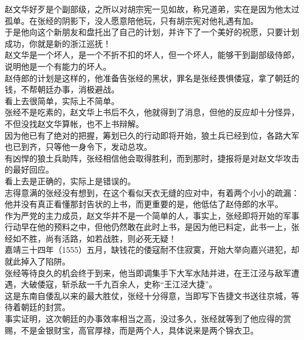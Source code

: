 \begin{multicols}{\theparacolNo}
赵文华好歹是个副部级，之所以对胡宗宪一见如故，称兄道弟，实在是因为他太过孤单。在张经的阴影下，没人愿意陪他玩，只有胡宗宪对他礼遇有加。\\

于是他向这个新朋友和盘托出了自己的计划，并许下了一个美好的祝愿，只要计划成功，你就是新的浙江巡抚！\\

赵文华是一个坏人，是一个不折不扣的坏人，但一个坏人，能够干到副部级侍郎，说明他是一个有能力的坏人。\\

赵侍郎的计划是这样的，他准备告张经的黑状，罪名是张经畏惧倭寇，拿了朝廷的钱，不帮朝廷办事，消极避战。\\

看上去很简单，实际上不简单。\\

张经不是吃素的，赵文华上书后不久，他就得到了消息，但他的反应却十分怪异，不但没找赵文华算帐，也不上书辩解。\\

因为他已有了绝对的把握，筹划已久的行动即将开始，狼土兵已经到位，各路大军也已到齐，只等他一身令下，发动总攻。\\

有凶悍的狼土兵助阵，张经相信他会取得胜利，而到那时，捷报将是对赵文华攻击的最好回应。\\

看上去是正确的，实际上是错误的。\\

志得意满的张经没有想到，在这个看似天衣无缝的应对中，有着两个小小的疏漏：他并没有真正看懂那封告状的上书，而更重要的是，他低估了赵侍郎的水平。\\

作为严党的主力成员，赵文华并不是一个简单的人，事实上，张经即将开始的军事行动早在他的预料之中，但他仍然敢在此时上书，是因为他已料定，此书一上，张经如不胜，尚有活路，如若战胜，则必死无疑！\\

嘉靖三十四年（1555）五月，缺钱花的倭寇耐不住寂寞，开始大举向嘉兴进犯，却就此掉入了陷阱。\\

张经等待良久的机会终于到来，他当即调集手下大军水陆并进，在王江泾与敌军遭遇，大破倭寇，斩杀敌一千九百余人，史称“王江泾大捷”。\\

这是东南自倭乱以来的最大胜仗，张经十分得意，当即写下告捷文书送往京城，等待着朝廷的封赏。\\

事实证明，这次朝廷的办事效率相当之高，没过多久，张经就等到了他应得的赏赐，不是金银财宝，高官厚禄，而是两个人，具体说来是两个锦衣卫。\\


\end{multicols}
